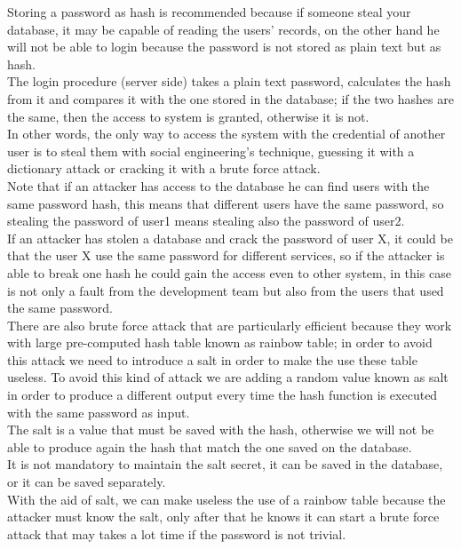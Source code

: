 Storing a password as hash is recommended because if someone steal your database, it may be capable of reading the users’ records, on the other hand he will not be able to login because the password is not stored as plain text but as hash.\\
The login procedure (server side) takes a plain text password, calculates the hash from it and compares it with the one stored in the database; if the two hashes are the same, then the access to system is granted, otherwise it is not.\\
In other words, the only way to access the system with the credential of another user is to steal them with social engineering’s technique, guessing it with a dictionary attack or cracking it with a brute force attack.\\
Note that if an attacker has access to the database he can find users with the same password hash, this means that different users have the same password, so stealing the password of user1 means stealing also the password of user2.\\
If an attacker has stolen a database and crack the password of user X, it could be that the user X use the same password for different services, so if the attacker is able to break one hash he could gain the access even to other system, in this case is not only a fault from the development team but also from the users that used the same password.\\
There are also brute force attack that are particularly efficient because they work with large pre-computed hash table known as rainbow table; in order to avoid this attack we need to introduce a salt in order to make the use these table useless.
To avoid this kind of attack we are adding a random value known as salt in order to produce a different output every time the hash function is executed with the same password as input.\\
The salt is a value that must be saved with the hash, otherwise we will not be able to produce again the hash that match the one saved on the database.\\
It is not mandatory to maintain the salt secret, it can be saved in the database, or it can be saved separately.\\
With the aid of salt, we can make useless the use of a rainbow table because the attacker must know the salt, only after that he knows it can start a brute force attack that may takes a lot time if the password is not trivial.\\


